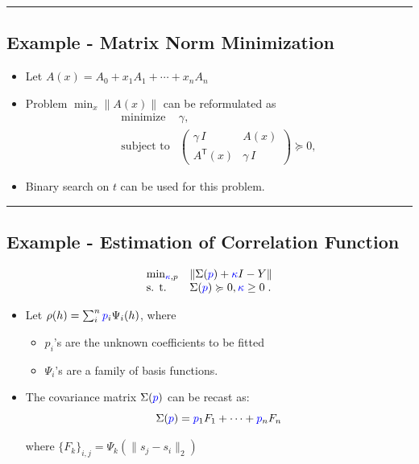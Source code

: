 \documentclass[
]{article}
\providecommand{\tightlist}{%
  \setlength{\itemsep}{0pt}\setlength{\parskip}{0pt}}
\begin{document}
\begin{center}\rule{0.5\linewidth}{0.5pt}\end{center}

\subsection{Example - Matrix Norm
Minimization}\label{example---matrix-norm-minimization}

\begin{itemize}
\tightlist
\item
  Let \(A(x) = A_0 + x_1 A_1 + \cdots + x_n A_n\)
\item
  Problem \(\min_x \| A(x) \|\) can be reformulated as
  \[\begin{array}{ll}
       \text{minimize}      & \gamma, \\
       \text{subject to}    & \left(
   \begin{array}{cc}
    \gamma\,I   & A(x) \\
    A^\mathsf{T}(x) & \gamma\,I
   \end{array} \right) \succeq 0,
   \end{array}\]
\item
  Binary search on \(t\) can be used for this problem.
\end{itemize}

\begin{center}\rule{0.5\linewidth}{0.5pt}\end{center}

\subsection{Example - Estimation of Correlation
Function}\label{example---estimation-of-correlation-function}

\[\begin{array}{ll}
   \min_{{\color{blue}\kappa}, p}   & \| \Sigma({\color{blue}p}) + {\color{blue}\kappa} I - Y \| \\
   \text{s. t.} & \Sigma({\color{blue}p}) \succcurlyeq 0,  {\color{blue}\kappa} \geq 0 \; .\\
 \end{array}\]

\begin{itemize}
\item
  Let \(\rho(h) = \sum_i^n {\color{blue}p}_i \Psi_i(h)\), where

  \begin{itemize}
  \tightlist
  \item
    \(p_i\)'s are the unknown coefficients to be fitted
  \item
    \(\Psi_i\)'s are a family of basis functions.
  \end{itemize}
\item
  The covariance matrix \(\Sigma({\color{blue}p})\) can be recast as:
  \[\Sigma({\color{blue}p}) = {\color{blue}p}_1 F_1 + \cdots + {\color{blue}p}_n F_n\]

  where \(\{F_k\}_{i,j} =\Psi_k( \| s_j - s_i \|_2)\)
\end{itemize}
\end{document}
